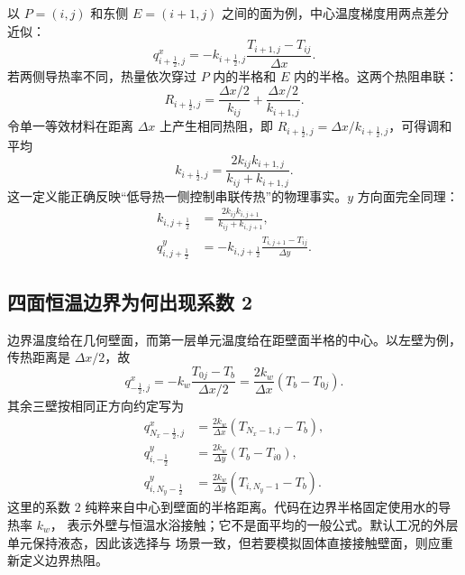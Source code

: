 \documentclass[UTF8,11pt]{ctexart}
\numberwithin{equation}{section}
\begin{document}
以 $P=(i,j)$ 和东侧 $E=(i+1,j)$ 之间的面为例，中心温度梯度用两点差分近似：
\begin{equation}
      q^x_{i+\frac12,j}
      =-k_{i+\frac12,j}
      \frac{T_{i+1,j}-T_{ij}}{\Delta x}.
      \label{eq:east-flux}
\end{equation}
若两侧导热率不同，热量依次穿过 $P$ 内的半格和 $E$ 内的半格。这两个热阻串联：
\begin{equation}
      R_{i+\frac12,j}
      =\frac{\Delta x/2}{k_{ij}}
      +\frac{\Delta x/2}{k_{i+1,j}}.
      \label{eq:series-resistance}
\end{equation}
令单一等效材料在距离 $\Delta x$ 上产生相同热阻，即
$R_{i+\frac12,j}=\Delta x/k_{i+\frac12,j}$，可得调和平均
\begin{equation}
      k_{i+\frac12,j}
      =\frac{2k_{ij}k_{i+1,j}}{k_{ij}+k_{i+1,j}}.
      \label{eq:harmonic-x}
\end{equation}
这一定义能正确反映“低导热一侧控制串联传热”的物理事实。$y$ 方向面完全同理：
\begin{align}
      k_{i,j+\frac12}
      &=\frac{2k_{ij}k_{i,j+1}}{k_{ij}+k_{i,j+1}},\\
      q^y_{i,j+\frac12}
      &=-k_{i,j+\frac12}
      \frac{T_{i,j+1}-T_{ij}}{\Delta y}.
      \label{eq:harmonic-y}
\end{align}

\subsection{四面恒温边界为何出现系数 2}

边界温度给在几何壁面，而第一层单元温度给在距壁面半格的中心。以左壁为例，传热距离是
$\Delta x/2$，故
\begin{equation}
      q^x_{-\frac12,j}
      =-k_w\frac{T_{0j}-T_b}{\Delta x/2}
      =\frac{2k_w}{\Delta x}(T_b-T_{0j}).
      \label{eq:left-boundary-flux}
\end{equation}
其余三壁按相同正方向约定写为
\begin{align}
      q^x_{N_x-\frac12,j}
      &=\frac{2k_w}{\Delta x}(T_{N_x-1,j}-T_b),
      \label{eq:right-boundary-flux}\\
      q^y_{i,-\frac12}
      &=\frac{2k_w}{\Delta y}(T_b-T_{i0}),
      \label{eq:bottom-boundary-flux}\\
      q^y_{i,N_y-\frac12}
      &=\frac{2k_w}{\Delta y}(T_{i,N_y-1}-T_b).
      \label{eq:top-boundary-flux}
\end{align}
这里的系数 $2$ 纯粹来自中心到壁面的半格距离。代码在边界半格固定使用水的导热率 $k_w$，
表示外壁与恒温水浴接触；它不是面平均的一般公式。默认工况的外层单元保持液态，因此该选择与
场景一致，但若要模拟固体直接接触壁面，则应重新定义边界热阻。
\end{document}

